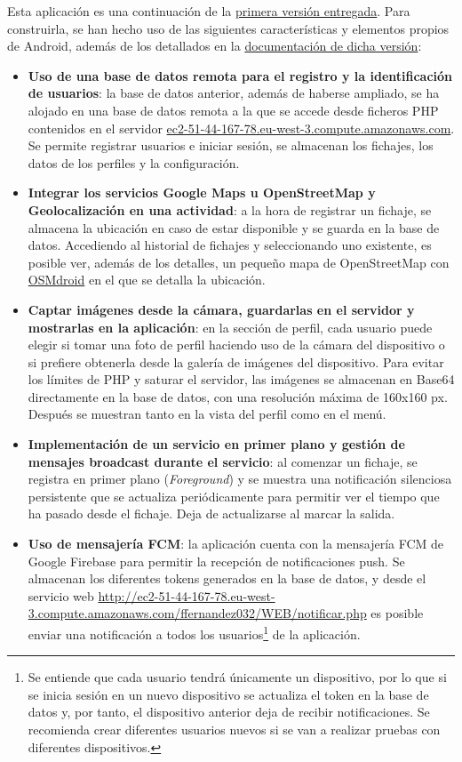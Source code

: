 Esta aplicación es una continuación de la \href{https://github.com/ffernandezco/DAS-Proyecto}{primera versión entregada}. Para construirla, se han hecho uso de las siguientes características y elementos propios de Android, además de los detallados en la \href{https://github.com/ffernandezco/DAS-Proyecto/blob/main/doc/handout.pdf}{documentación de dicha versión}:

\begin{itemize}
    \item \textbf{Uso de una base de datos remota para el registro y la identificación de usuarios}: la base de datos anterior, además de haberse ampliado, se ha alojado en una base de datos remota a la que se accede desde ficheros PHP contenidos en el servidor \url{ec2-51-44-167-78.eu-west-3.compute.amazonaws.com}. Se permite registrar usuarios e iniciar sesión, se almacenan los fichajes, los datos de los perfiles y la configuración.
    \item \textbf{Integrar los servicios Google Maps u OpenStreetMap y Geolocalización en una actividad}: a la hora de registrar un fichaje, se almacena la ubicación en caso de estar disponible y se guarda en la base de datos. Accediendo al historial de fichajes y seleccionando uno existente, es posible ver, además de los detalles, un pequeño mapa de OpenStreetMap con \href{https://github.com/osmdroid/osmdroid}{OSMdroid} en el que se detalla la ubicación.
    \item \textbf{Captar imágenes desde la cámara, guardarlas en el servidor y mostrarlas en la aplicación}: en la sección de perfil, cada usuario puede elegir si tomar una foto de perfil haciendo uso de la cámara del dispositivo o si prefiere obtenerla desde la galería de imágenes del dispositivo. Para evitar los límites de PHP y saturar el servidor, las imágenes se almacenan en Base64 directamente en la base de datos, con una resolución máxima de 160x160 px. Después se muestran tanto en la vista del perfil como en el menú.
    \item \textbf{Implementación de un servicio en primer plano y gestión de mensajes broadcast durante el servicio}: al comenzar un fichaje, se registra en primer plano (\textit{Foreground}) y se muestra una notificación silenciosa persistente que se actualiza periódicamente para permitir ver el tiempo que ha pasado desde el fichaje. Deja de actualizarse al marcar la salida.
    \item \textbf{Uso de mensajería FCM}: la aplicación cuenta con la mensajería FCM de Google Firebase para permitir la recepción de notificaciones push. Se almacenan los diferentes tokens generados en la base de datos, y desde el servicio web \url{http://ec2-51-44-167-78.eu-west-3.compute.amazonaws.com/ffernandez032/WEB/notificar.php} es posible enviar una notificación a todos los usuarios\footnote{Se entiende que cada usuario tendrá únicamente un dispositivo, por lo que si se inicia sesión en un nuevo dispositivo se actualiza el token en la base de datos y, por tanto, el dispositivo anterior deja de recibir notificaciones. Se recomienda crear diferentes usuarios nuevos si se van a realizar pruebas con diferentes dispositivos.} de la aplicación.

\end{itemize}
